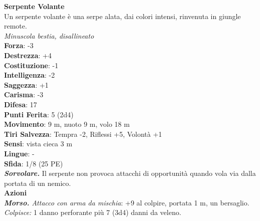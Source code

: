\begin{multicols}{2}
\medskip\textbf{Serpente Volante}\\
Un serpente volante è una serpe alata, dai colori intensi, rinvenuta in giungle remote.\\
\emph{Minuscola bestia, disallineato}\\
\textbf{Forza}: -3\\
\textbf{Destrezza}: +4\\
\textbf{Costituzione}: -1\\
\textbf{Intelligenza}: -2\\
\textbf{Saggezza}: +1\\
\textbf{Carisma}: -3\\
\textbf{Difesa}: 17\\
\textbf{Punti Ferita}: 5 (2d4)\\
\textbf{Movimento}: 9 m, nuoto 9 m, volo 18 m\\
\textbf{Tiri Salvezza}: Tempra -2, Riflessi +5, Volontà +1\\
\textbf{Sensi}: vista cieca 3 m\\
\textbf{Lingue}: -\\
\textbf{Sfida}: 1/8 (25 PE)\smallskip\\
\emph{\textbf{Sorvolare.}} Il serpente non provoca attacchi di opportunità quando vola via dalla portata di un nemico.\\
\smallskip\textbf{Azioni}\\
\emph{\textbf{Morso.} Attacco con arma da mischia}: +9 al colpire, portata 1 m, un bersaglio.\\
\emph{Colpisce:} 1 danno perforante più 7 (3d4) danni da veleno.\\


\end{multicols}
